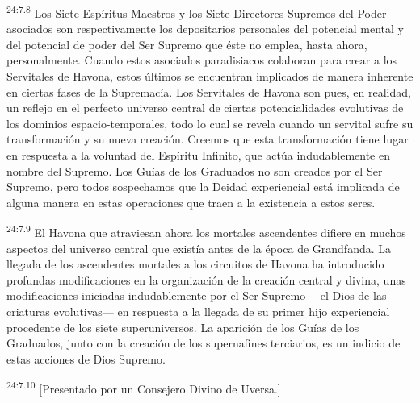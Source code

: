 \par
\textsuperscript{24:7.8} Los Siete Espíritus Maestros y los Siete Directores Supremos del Poder asociados son respectivamente los depositarios personales del potencial mental y del potencial de poder del Ser Supremo que éste no emplea, hasta ahora, personalmente. Cuando estos asociados paradisiacos colaboran para crear a los Servitales de Havona, estos últimos se encuentran implicados de manera inherente en ciertas fases de la Supremacía. Los Servitales de Havona son pues, en realidad, un reflejo en el perfecto universo central de ciertas potencialidades evolutivas de los dominios espacio-temporales, todo lo cual se revela cuando un servital sufre su transformación y su nueva creación. Creemos que esta transformación tiene lugar en respuesta a la voluntad del Espíritu Infinito, que actúa indudablemente en nombre del Supremo. Los Guías de los Graduados no son creados por el Ser Supremo, pero todos sospechamos que la Deidad experiencial está implicada de alguna manera en estas operaciones que traen a la existencia a estos seres.

\par
\textsuperscript{24:7.9} El Havona que atraviesan ahora los mortales ascendentes difiere en muchos aspectos del universo central que existía antes de la época de Grandfanda. La llegada de los ascendentes mortales a los circuitos de Havona ha introducido profundas modificaciones en la organización de la creación central y divina, unas modificaciones iniciadas indudablemente por el Ser Supremo ---el Dios de las criaturas evolutivas--- en respuesta a la llegada de su primer hijo experiencial procedente de los siete superuniversos. La aparición de los Guías de los Graduados, junto con la creación de los supernafines terciarios, es un indicio de estas acciones de Dios Supremo.

\par
\textsuperscript{24:7.10} [Presentado por un Consejero Divino de Uversa.]